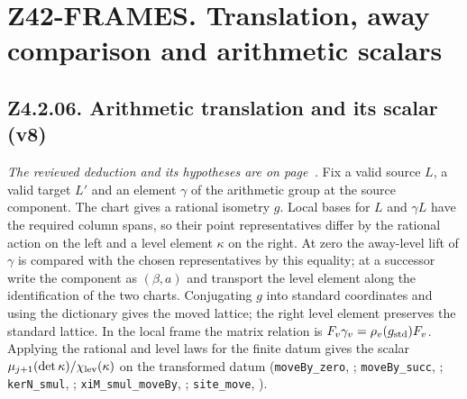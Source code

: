 \section*{Z42-FRAMES. Translation, away comparison and arithmetic scalars}

\subsection{Z4.2.06. Arithmetic translation and its scalar (v8)}\label{r6:Z4.2.06}
\emph{The reviewed deduction and its hypotheses are on page~\pageref{r8:Z4.2.06}.}
Fix a valid source \(L\), a valid target \(L'\) and an element \(\gamma\) of the arithmetic group at the source component. The chart gives a rational isometry \(g\). Local bases for \(L\) and \(\gamma L\) have the required column spans, so their point representatives differ by the rational action on the left and a level element \(\kappa\) on the right. At zero the away-level lift of \(\gamma\) is compared with the chosen representatives by this equality; at a successor write the component as \((\beta,a)\) and transport the level element along the identification of the two charts. Conjugating \(g\) into standard coordinates and using the dictionary gives the moved lattice; the right level element preserves the standard lattice. In the local frame the matrix relation is \(F_v\gamma_v=\rho_v(g_{\rm std})F_v\). Applying the rational and level laws for the finite datum gives the scalar \(\mu_{j+1}(\det\kappa)/\chi_{\rm lev}(\kappa)\) on the transformed datum (\nolinkurl{moveBy_zero}, ; \nolinkurl{moveBy_succ}, ; \nolinkurl{kerN_smul}, ; \nolinkurl{xiM_smul_moveBy}, ; \nolinkurl{site_move}, ).


